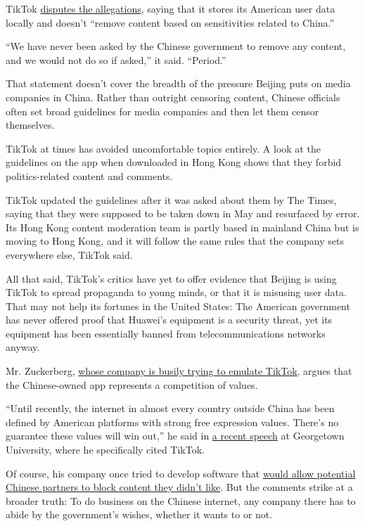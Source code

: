 TikTok
\href{https://newsroom.tiktok.com/en-us/statement-on-tiktoks-content-moderation-and-data-security-practices}{disputes
the allegations}, saying that it stores its American user data locally
and doesn't ``remove content based on sensitivities related to China.''

``We have never been asked by the Chinese government to remove any
content, and we would not do so if asked,'' it said. ``Period.''

That statement doesn't cover the breadth of the pressure Beijing puts on
media companies in China. Rather than outright censoring content,
Chinese officials often set broad guidelines for media companies and
then let them censor themselves.

TikTok at times has avoided uncomfortable topics entirely. A look at the
guidelines on the app when downloaded in Hong Kong shows that they
forbid politics-related content and comments.

TikTok updated the guidelines after it was asked about them by The
Times, saying that they were supposed to be taken down in May and
resurfaced by error. Its Hong Kong content moderation team is partly
based in mainland China but is moving to Hong Kong, and it will follow
the same rules that the company sets everywhere else, TikTok said.

All that said, TikTok's critics have yet to offer evidence that Beijing
is using TikTok to spread propaganda to young minds, or that it is
misusing user data. That may not help its fortunes in the United States:
The American government has never offered proof that Huawei's equipment
is a security threat, yet its equipment has been essentially banned from
telecommunications networks anyway.

Mr. Zuckerberg,
\href{https://www.nytimes.com/2019/11/03/technology/tiktok-facebook-youtube.html}{whose
company is busily trying to emulate TikTok}, argues that the
Chinese-owned app represents a competition of values.

``Until recently, the internet in almost every country outside China has
been defined by American platforms with strong free expression values.
There's no guarantee these values will win out,'' he said in
\href{https://www.washingtonpost.com/technology/2019/10/17/zuckerberg-standing-voice-free-expression/}{a
recent speech} at Georgetown University, where he specifically cited
TikTok.

Of course, his company once tried to develop software that
\href{https://www.nytimes.com/2016/11/22/technology/facebook-censorship-tool-china.html}{would
allow potential Chinese partners to block content they didn't like}. But
the comments strike at a broader truth: To do business on the Chinese
internet, any company there has to abide by the government's wishes,
whether it wants to or not.

